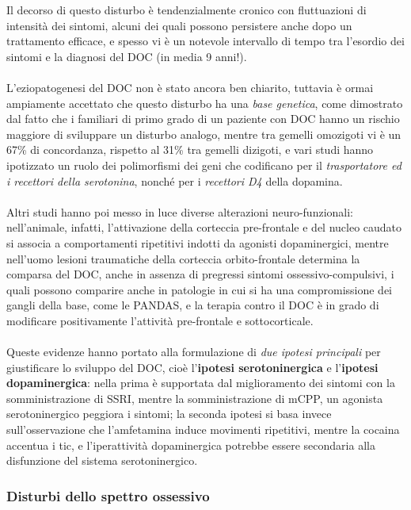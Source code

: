 Il decorso di questo disturbo è tendenzialmente cronico con fluttuazioni
di intensità dei sintomi, alcuni dei quali possono persistere anche dopo
un trattamento efficace, e spesso vi è un notevole intervallo di tempo
tra l'esordio dei sintomi e la diagnosi del DOC (in media 9 anni!).
\\\\
L'eziopatogenesi del DOC non è stato ancora ben chiarito, tuttavia è
ormai ampiamente accettato che questo disturbo ha una \emph{base
genetica}, come dimostrato dal fatto che i familiari di primo grado di
un paziente con DOC hanno un rischio maggiore di sviluppare un disturbo
analogo, mentre tra gemelli omozigoti vi è un 67\% di concordanza,
rispetto al 31\% tra gemelli dizigoti, e vari studi hanno ipotizzato un
ruolo dei polimorfismi dei geni che codificano per il
\emph{trasportatore ed i recettori della serotonina}, nonché per i
\emph{recettori D4} della dopamina.
\\\\
Altri studi hanno poi messo in luce diverse alterazioni
neuro-funzionali: nell'animale, infatti, l'attivazione della corteccia
pre-frontale e del nucleo caudato si associa a comportamenti ripetitivi
indotti da agonisti dopaminergici, mentre nell'uomo lesioni traumatiche
della corteccia orbito-frontale determina la comparsa del DOC, anche in
assenza di pregressi sintomi ossessivo-compulsivi, i quali possono
comparire anche in patologie in cui si ha una compromissione dei gangli
della base, come le PANDAS, e la terapia contro il DOC è in grado di
modificare positivamente l'attività pre-frontale e sottocorticale.
\\\\
Queste evidenze hanno portato alla formulazione di \emph{due ipotesi
principali} per giustificare lo sviluppo del DOC, cioè l'\textbf{ipotesi
serotoninergica} e l'\textbf{ipotesi dopaminergica}: nella prima è
supportata dal miglioramento dei sintomi con la somministrazione di
SSRI, mentre la somministrazione di mCPP, un agonista serotoninergico
peggiora i sintomi; la seconda ipotesi si basa invece sull'osservazione
che l'amfetamina induce movimenti ripetitivi, mentre la cocaina accentua
i tic, e l'iperattività dopaminergica potrebbe essere secondaria alla
disfunzione del sistema serotoninergico.

\subsubsection{Disturbi dello spettro ossessivo}

